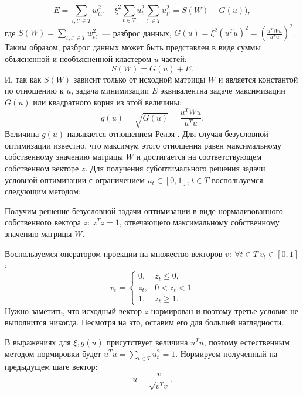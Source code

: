 \documentclass[12pt]{article}
\newenvironment{enumerate*}%
{\begin{enumerate}%
	\setlength{\itemsep}{0pt}%
	\setlength{\parskip}{0pt}}%
{\end{enumerate}}
\begin{document}
\begin{equation}
	E = \sum_{t,t'\in T}w_{tt'}^2-\xi^2 \sum_{t\in T}u_t^2 \sum_{t'\in T}u_{t'}^2 = S(W) - G(u)),
\end{equation}
где $S(W)=\sum_{t,t'\in T}w_{tt'}^2$ --- разброс данных, $G(u) = \xi^2 (u^Tu)^2= \left(\frac{u^TWu}{u^Tu}\right)^2$. Таким образом, разброс данных может быть представлен в виде суммы объясненной и необъясненной кластером $u$ частей:
\begin{equation}
	S(W)=G(u)+E.
\end{equation}
И, так как $S(W)$ зависит только от исходной матрицы $W$ и является константой по отношению к $u$, задача минимизации $E$ эквивалентна задаче максимизации $G(u)$ или квадратного корня из этой величины:
\begin{equation}
	g(u)=\sqrt{G(u)} = \frac{u^TWu}{u^Tu}.
	\label{eq:rayleigh}
\end{equation}
Величина  $g(u)$ называется отношением Релэя \cite{parlett1998symmetric}. Для случая безусловной оптимизации известно, что максимум этого отношения равен максимальному собственному значению матрицы $W$ и достигается на соответствующем собственном векторе $z$. Для получения субоптимального решения задачи условной оптимизации с ограничением $u_t\in[0, 1], t\in T$ воспользуемся следующим методом:
\begin{enumerate*}
	\item Получим решение безусловной задачи оптимизации в виде нормализованного собственного вектора $z:\ z^Tz=1$, отвечающего максимальному собственному значению матрицы $W$.
	\item Воспользуемся оператором проекции на множество векторов ${v:\ \forall t\in T\ v_t\in[0, 1]}$:
	\begin{equation}
		v_t =\begin{cases}
		0, & z_t \leq 0,\\
		z_t, & 0<z_t<1\\
		1, & z_t\geq 1.
		\end{cases}
	\end{equation}
	Нужно заметить, что исходный вектор $z$ нормирован и поэтому третье условие не выполнится никогда. Несмотря на это, оставим его для большей наглядности.
	\item В выражениях для $\xi, g(u)$ присутствует величина $u^Tu$, поэтому естественным методом нормировки будет $u^Tu=\sum_{t\in T} u_t^2=1$. Нормируем полученный на предыдущем шаге вектор:
	\begin{equation}
		u = \frac{v}{\sqrt{v^Tv}}.
	\end{equation}
\end{enumerate*}
\end{document}
